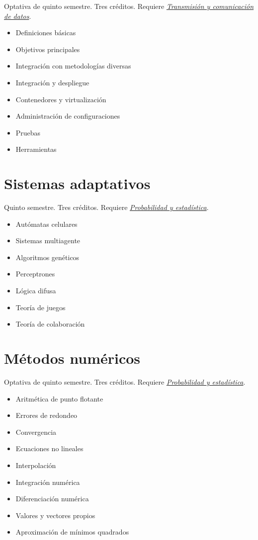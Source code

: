 \documentclass{article}
\begin{document}
\begin{multicols}{4}
Optativa de quinto semestre. Tres cr\'{e}ditos. Requiere
\hyperlink{tycdd}{\em Transmisi\'{o}n y comunicaci\'{o}n de datos}.

\begin{itemize}
\item{Definiciones b\'{a}sicas}
\item{Objetivos principales}
\item{Integraci\'{o}n con metodolog\'{i}as diversas}
\item{Integraci\'{o}n y despliegue}
\item{Contenedores y virtualizaci\'{o}n}
\item{Administraci\'{o}n de configuraciones}
\item{Pruebas}
\item{Herramientas}
\end{itemize}

\newpage

\hypertarget{sa}{\section*{Sistemas adaptativos}} 

Quinto semestre. Tres cr\'{e}ditos. Requiere \hyperlink{pye}{\em
  Probabilidad y estad\'{i}stica}.

\begin{itemize}
\item{Aut\'{o}matas celulares}
\item{Sistemas multiagente}
\item{Algoritmos gen\'{e}ticos}
\item{Perceptrones}
\item{L\'{o}gica difusa}
\item{Teor\'{i}a de juegos}
\item{Teor\'{i}a de colaboraci\'{o}n}
\end{itemize}

\vfill\null \columnbreak

\hypertarget{mn}{\section*{M\'{e}todos num\'{e}ricos}}

Optativa de quinto semestre. Tres cr\'{e}ditos. Requiere \hyperlink{pye}{\em
  Probabilidad y estad\'{i}stica}.

\begin{itemize}
\item{Aritm\'{e}tica de punto flotante}
\item{Errores de redondeo}
\item{Convergencia}
\item{Ecuaciones no lineales}
\item{Interpolaci\'{o}n}
\item{Integraci\'{o}n num\'{e}rica}
\item{Diferenciaci\'{o}n num\'{e}rica}
\item{Valores y vectores propios}
\item{Aproximaci\'{o}n de m\'{i}nimos quadrados}
\end{itemize}


\end{multicols}
\end{document}
